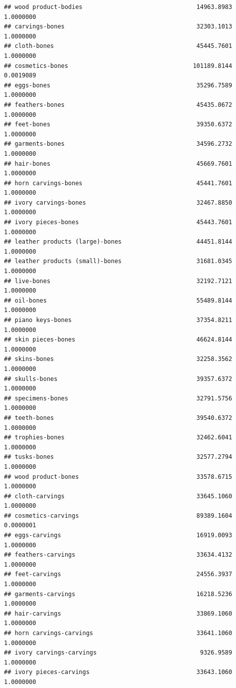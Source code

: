 \documentclass[
  12pt,
]{article}
\begin{document}
\begin{verbatim}
## wood product-bodies                                14963.8983 1.0000000
## carvings-bones                                     32303.1013 1.0000000
## cloth-bones                                        45445.7601 1.0000000
## cosmetics-bones                                   101189.8144 0.0019089
## eggs-bones                                         35296.7589 1.0000000
## feathers-bones                                     45435.0672 1.0000000
## feet-bones                                         39350.6372 1.0000000
## garments-bones                                     34596.2732 1.0000000
## hair-bones                                         45669.7601 1.0000000
## horn carvings-bones                                45441.7601 1.0000000
## ivory carvings-bones                               32467.8850 1.0000000
## ivory pieces-bones                                 45443.7601 1.0000000
## leather products (large)-bones                     44451.8144 1.0000000
## leather products (small)-bones                     31681.0345 1.0000000
## live-bones                                         32192.7121 1.0000000
## oil-bones                                          55489.8144 1.0000000
## piano keys-bones                                   37354.8211 1.0000000
## skin pieces-bones                                  46624.8144 1.0000000
## skins-bones                                        32258.3562 1.0000000
## skulls-bones                                       39357.6372 1.0000000
## specimens-bones                                    32791.5756 1.0000000
## teeth-bones                                        39540.6372 1.0000000
## trophies-bones                                     32462.6041 1.0000000
## tusks-bones                                        32577.2794 1.0000000
## wood product-bones                                 33578.6715 1.0000000
## cloth-carvings                                     33645.1060 1.0000000
## cosmetics-carvings                                 89389.1604 0.0000001
## eggs-carvings                                      16919.0093 1.0000000
## feathers-carvings                                  33634.4132 1.0000000
## feet-carvings                                      24556.3937 1.0000000
## garments-carvings                                  16218.5236 1.0000000
## hair-carvings                                      33869.1060 1.0000000
## horn carvings-carvings                             33641.1060 1.0000000
## ivory carvings-carvings                             9326.9589 1.0000000
## ivory pieces-carvings                              33643.1060 1.0000000

\end{verbatim}
\end{document}
